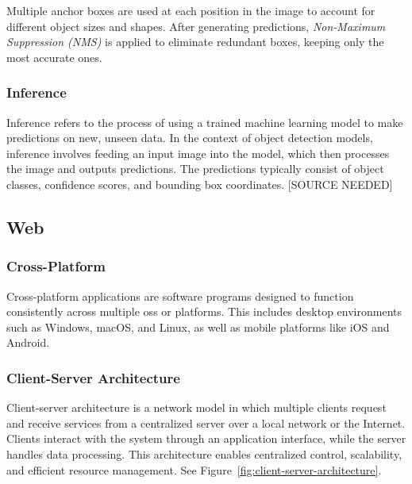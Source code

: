 Multiple anchor boxes are used at each position in the image to account for different object sizes and shapes. After generating predictions, \textit{Non-Maximum Suppression (NMS)} is applied to eliminate redundant boxes, keeping only the most accurate ones.



\subsubsection*{Inference} 
Inference refers to the process of using a trained machine learning model to make predictions on new, unseen data. In the context of object detection models, inference involves feeding an input image into the model, which then processes the image and outputs predictions. The predictions typically consist of object classes, confidence scores, and bounding box coordinates. [SOURCE NEEDED]





\subsection{Web}
\label{subsec:web}

\subsubsection*{Cross-Platform}
\label{subsubsec:corss-platform}

Cross-platform applications are software programs designed to function consistently across multiple \glspl{os} or platforms. This includes desktop environments such as Windows, macOS, and Linux, as well as mobile platforms like iOS and Android. \cite{sevenpeaks:cross-platform}

\subsubsection*{Client-Server Architecture}
\label{subsubsec:client-server}

Client-server architecture is a network model in which multiple clients request and receive services from a centralized server over a local network or the Internet. Clients interact with the system through an application interface, while the server handles data processing. This architecture enables centralized control, scalability, and efficient resource management. See Figure~\ref{fig:client-server-architecture}. \cite{liquidweb:client-server}


